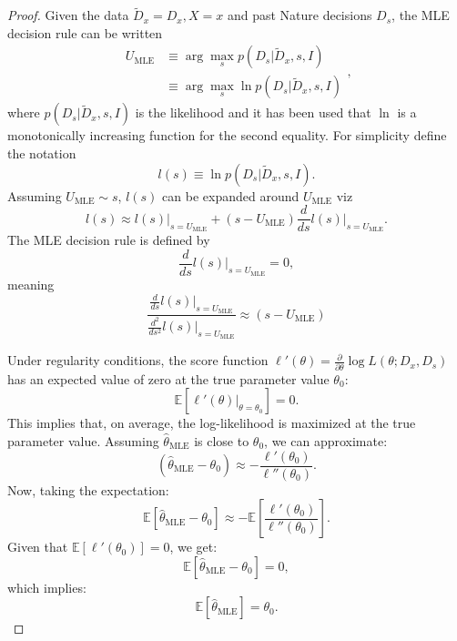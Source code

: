 \begin{proof}
	Given the data $\tilde{D}_x = D_x,X=x$ and past Nature decisions $D_s$, the MLE decision rule can be written
	\begin{equation}
		\begin{split}
			U_{\text{MLE}} &\equiv \arg \max_{s} p(D_s|\tilde{D}_x,s,I)\\
			&\equiv \arg \max_{s} \ln p(D_s|\tilde{D}_x,s,I)
		\end{split},
	\end{equation}
	where $p(D_s|\tilde{D}_x,s,I)$ is the likelihood and it has been used that $\ln$ is a monotonically increasing function for the second equality. For simplicity define the notation
	\begin{equation}
		l(s) \equiv \ln p(D_s|\tilde{D}_x,s,I).
	\end{equation}	
	Assuming $U_{\text{MLE}}\sim s$, $l(s)$ can be expanded around $U_{\text{MLE}}$ viz
	\begin{equation}
		l(s)\approx l(s)|_{s=U_{\text{MLE}}}+(s-U_{\text{MLE}})\frac{d}{ds}l(s)\bigg|_{s=U_{\text{MLE}}}.
	\end{equation}
	The MLE decision rule is defined by
	\begin{equation}
		\frac{d}{ds}l(s)\bigg|_{s=U_{\text{MLE}}} = 0,
	\end{equation}
	meaning
	\begin{equation}
		\frac{\frac{d}{ds}l(s)|_{s=U_{\text{MLE}}}}{\frac{d^2}{ds^2}l(s)|_{s=U_{\text{MLE}}}}\approx(s-U_{\text{MLE}})
	\end{equation}
	
	
	Under regularity conditions, the score function \( \ell'(\theta) = \frac{\partial}{\partial \theta} \log L(\theta; D_x, D_s) \) has an expected value of zero at the true parameter value \( \theta_0 \):
	\begin{equation}
		\mathbb{E}\left[\ell'(\theta)\bigg|_{\theta = \theta_0}\right] = 0.
	\end{equation}
	This implies that, on average, the log-likelihood is maximized at the true parameter value. 
	Assuming \(\hat{\theta}_{\text{MLE}}\) is close to \(\theta_0\), we can approximate:
	\[
	(\hat{\theta}_{\text{MLE}} - \theta_0) \approx - \frac{\ell'(\theta_0)}{\ell''(\theta_0)}.
	\]
	Now, taking the expectation:
	\[
	\mathbb{E}[\hat{\theta}_{\text{MLE}} - \theta_0] \approx - \mathbb{E}\left[\frac{\ell'(\theta_0)}{\ell''(\theta_0)}\right].
	\]
	Given that \(\mathbb{E}[\ell'(\theta_0)] = 0\), we get:
	\[
	\mathbb{E}[\hat{\theta}_{\text{MLE}} - \theta_0] = 0,
	\]
	which implies:
	\[
	\mathbb{E}[\hat{\theta}_{\text{MLE}}] = \theta_0.
	\]
\end{proof}

